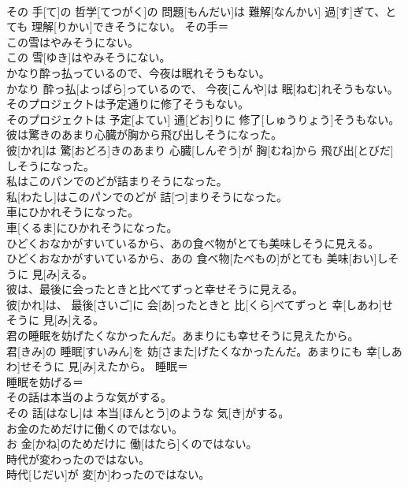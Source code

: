 \documentclass[8pt]{extreport}
\begin{document}
\begin{CJK}{UTF8}{min}
\\	その 手[て]の 哲学[てつがく]の 問題[もんだい]は 難解[なんかい] 過[す]ぎて、とても 理解[りかい]できそうにない。	その手＝ 
\\	この雪はやみそうにない。	
\\	この 雪[ゆき]はやみそうにない。	
\\	かなり酔っ払っているので、今夜は眠れそうもない。	
\\	かなり 酔っ払[よっぱら]っているので、 今夜[こんや]は 眠[ねむ]れそうもない。	
\\	そのプロジェクトは予定通りに修了そうもない。	
\\	そのプロジェクトは 予定[よてい] 通[どお]りに 修了[しゅうりょう]そうもない。	
\\	彼は驚きのあまり心臓が胸から飛び出しそうになった。	
\\	彼[かれ]は 驚[おどろ]きのあまり 心臓[しんぞう]が 胸[むね]から 飛び出[とびだ]しそうになった。	
\\	私はこのパンでのどが詰まりそうになった。	
\\	私[わたし]はこのパンでのどが 詰[つ]まりそうになった。	
\\	車にひかれそうになった。	
\\	車[くるま]にひかれそうになった。	
\\	ひどくおなかがすいているから、あの食べ物がとても美味しそうに見える。	
\\	ひどくおなかがすいているから、あの 食べ物[たべもの]がとても 美味[おい]しそうに 見[み]える。	
\\	彼は、最後に会ったときと比べてずっと幸せそうに見える。	
\\	彼[かれ]は、 最後[さいご]に 会[あ]ったときと 比[くら]べてずっと 幸[しあわ]せそうに 見[み]える。	
\\	君の睡眠を妨げたくなかったんだ。あまりにも幸せそうに見えたから。	
\\	君[きみ]の 睡眠[すいみん]を 妨[さまた]げたくなかったんだ。あまりにも 幸[しあわ]せそうに 見[み]えたから。	睡眠＝ 
\\	睡眠を妨げる＝ 
\\	その話は本当のような気がする。	
\\	その 話[はなし]は 本当[ほんとう]のような 気[き]がする。	
\\	お金のためだけに働くのではない。	
\\	お 金[かね]のためだけに 働[はたら]くのではない。	
\\	時代が変わったのではない。	
\\	時代[じだい]が 変[か]わったのではない。	

\end{CJK}
\end{document}

